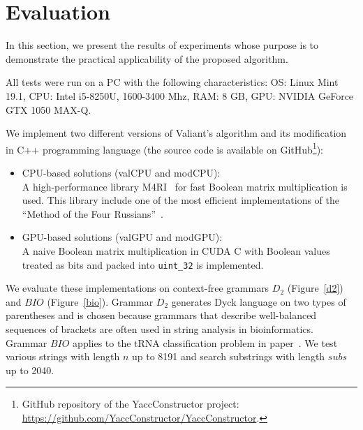 \section{Evaluation}

In this section, we present the results of experiments whose purpose is to demonstrate the practical applicability of the proposed algorithm.

All tests were run on a PC with the following characteristics: OS: Linux Mint 19.1, CPU: Intel i5-8250U, 1600-3400 Mhz, RAM: 8 GB, GPU: NVIDIA GeForce GTX 1050 MAX-Q.

We implement two different versions of Valiant's algorithm and its modification in C++ programming language (the source code is available on GitHub\footnote{GitHub repository of the YaccConstructor project: \url{https://github.com/YaccConstructor/YaccConstructor}.}):

\begin{itemize}
    \item CPU-based solutions (\textsf{valCPU} and \textsf{modCPU}): \\
    A high-performance library M4RI~\cite{Albrecht_2010} for fast Boolean matrix multiplication is used. This library include one of the most efficient implementations of the “Method of the Four Russians”~\cite{arlazarov1970economical}.
    \item GPU-based solutions (\textsf{valGPU} and \textsf{modGPU}): \\
    A naive Boolean matrix multiplication in CUDA C with Boolean values treated as bits and packed into \texttt{uint\_32} is implemented.
\end{itemize}


We evaluate these implementations on context-free grammars $D_2$ (Figure~\ref{d2}) and $BIO$ (Figure~\ref{bio}).
Grammar $D_2$ generates Dyck language on two types of parentheses and is chosen because grammars that describe well-balanced sequences of brackets are often used in string analysis in bioinformatics. 
Grammar $BIO$ applies to the tRNA classification problem in paper~\cite{bioinformatics19}.
We test various strings with length $n$ up to 8191 and search substrings with length $subs$ up to 2040.


